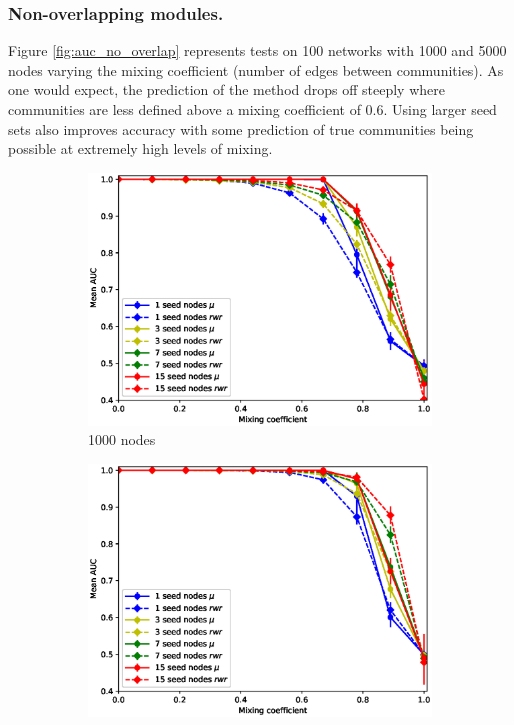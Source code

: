 \documentclass[sigconf]{acmart}
\begin{document}
\subsubsection{Non-overlapping modules.}
Figure \ref{fig:auc_no_overlap} represents tests on 100 networks with 1000 and 5000 nodes varying the mixing coefficient (number of edges between communities).
As one would expect, the prediction of the method drops off steeply where communities are less defined above a mixing coefficient of 0.6.
Using larger seed sets also improves accuracy with some prediction of true communities being possible at extremely high levels of mixing.

\begin{figure}[ht]
    \centering
    \begin{subfigure}[b]{0.48\textwidth}
        \centering
        \includegraphics[width=\textwidth]{images/lfr_binary_mo_overlap_auc_1000.eps}
        \caption{1000 nodes}
    \end{subfigure}
    \begin{subfigure}[b]{0.48\textwidth}
        \centering
        \includegraphics[width=\textwidth]{images/lfr_binary_mo_overlap_auc_5000.eps}

\end{subfigure}
\end{figure}
\end{document}
